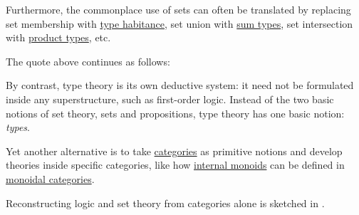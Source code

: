 \begin{concept}
\begin{thmenum}
    Furthermore, the commonplace use of sets can often be translated by replacing set membership with \hyperref[def:type_habitation]{type habitance}, set union with \hyperref[def:dependent_sum]{sum types}, set intersection with \hyperref[def:dependent_product]{product types}, etc.

    The quote above continues as follows:
    \begin{displayquote}
      By contrast, type theory is its own deductive system: it need not be formulated inside any superstructure, such as first-order logic. Instead of the two basic notions of set theory, sets and propositions, type theory has one basic notion: \textit{types}.
    \end{displayquote}

     Yet another alternative is to take \hyperref[def:category]{categories} as primitive notions and develop theories inside specific categories, like how \hyperref[def:categorical_monoid]{internal monoids} can be defined in \hyperref[def:monoidal_category]{monoidal categories}.

    Reconstructing logic and set theory from categories alone is sketched in \cite{Awodey2009SetsTypesCategories}.
  \end{thmenum}
\end{concept}
